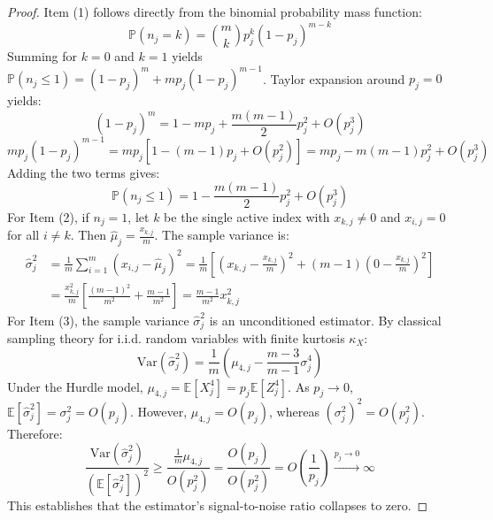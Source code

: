 \documentclass[twocolumn,10pt]{article}
\begin{document}
\begin{proof}
Item (1) follows directly from the binomial probability mass function:
\begin{equation*}
\mathbb{P}(n_j = k) = \binom{m}{k} p_j^k (1 - p_j)^{m-k}
\end{equation*}
Summing for $k=0$ and $k=1$ yields $\mathbb{P}(n_j \le 1) = (1 - p_j)^m + m p_j (1 - p_j)^{m-1}$. Taylor expansion around $p_j = 0$ yields:
\begin{equation*}
(1 - p_j)^m = 1 - m p_j + \frac{m(m-1)}{2}p_j^2 + O(p_j^3)
\end{equation*}
\begin{equation*}
m p_j (1 - p_j)^{m-1} = m p_j [1 - (m-1)p_j + O(p_j^2)] = m p_j - m(m-1)p_j^2 + O(p_j^3)
\end{equation*}
Adding the two terms gives:
\begin{equation*}
\mathbb{P}(n_j \le 1) = 1 - \frac{m(m-1)}{2}p_j^2 + O(p_j^3)
\end{equation*}
For Item (2), if $n_j = 1$, let $k$ be the single active index with $x_{k,j} \neq 0$ and $x_{i,j} = 0$ for all $i \neq k$. Then $\hat{\mu}_j = \frac{x_{k,j}}{m}$. The sample variance is:
\begin{align*}
\hat{\sigma}_j^2 &= \frac{1}{m}\sum_{i=1}^m (x_{i,j} - \hat{\mu}_j)^2 = \frac{1}{m}\left[ \left(x_{k,j} - \frac{x_{k,j}}{m}\right)^2 + (m-1)\left(0 - \frac{x_{k,j}}{m}\right)^2 \right] \\
&= \frac{x_{k,j}^2}{m}\left[ \frac{(m-1)^2}{m^2} + \frac{m-1}{m^2} \right] = \frac{m-1}{m^2}x_{k,j}^2
\end{align*}
For Item (3), the sample variance $\hat{\sigma}_j^2$ is an unconditioned estimator. By classical sampling theory for i.i.d. random variables with finite kurtosis $\kappa_{X}$:
\begin{equation*}
\mathrm{Var}(\hat{\sigma}_j^2) = \frac{1}{m}\left( \mu_{4,j} - \frac{m-3}{m-1}\sigma_j^4 \right)
\end{equation*}
Under the Hurdle model, $\mu_{4,j} = \mathbb{E}[X_j^4] = p_j \mathbb{E}[Z_j^4]$. As $p_j \to 0$, $\mathbb{E}[\hat{\sigma}_j^2] = \sigma_j^2 = O(p_j)$. However, $\mu_{4,j} = O(p_j)$, whereas $(\sigma_j^2)^2 = O(p_j^2)$. Therefore:
\begin{equation*}
\frac{\mathrm{Var}(\hat{\sigma}_j^2)}{(\mathbb{E}[\hat{\sigma}_j^2])^2} \ge \frac{\frac{1}{m}\mu_{4,j}}{O(p_j^2)} = \frac{O(p_j)}{O(p_j^2)} = O\left(\frac{1}{p_j}\right) \xrightarrow{p_j \to 0} \infty
\end{equation*}
This establishes that the estimator's signal-to-noise ratio collapses to zero.
\end{proof}
\end{document}
